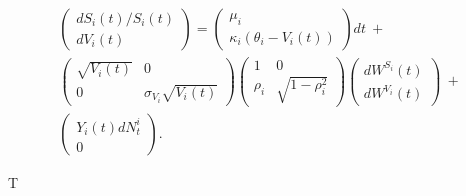 \begin{multline}
\begin{pmatrix}
dS_i(t) / S_i(t)\\
dV_i(t)
\end{pmatrix}
= \begin{pmatrix}
\mu_i\\
\kappa_i (\theta_i - V_i(t))
\end{pmatrix}
dt  \:+\\ 
\begin{pmatrix}
\sqrt{V_i(t)} & 0 \\
0 & \sigma_{V_i} \sqrt{V_i(t)} 
\end{pmatrix}
\begin{pmatrix}
1 & 0 \\
\rho_i & \sqrt{1-\rho_i^2} 
\end{pmatrix}
\begin{pmatrix}
dW^{S_i}(t)\\
dW^{V_i }(t)
\end{pmatrix}
\: + \\
\begin{pmatrix}
Y_i(t) dN^i_t  \\
0   
\end{pmatrix}.
\end{multline}


T